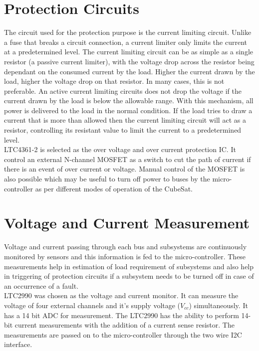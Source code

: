 \section[Protection Circuits]{Protection Circuits}
The circuit used for the protection purpose is the current limiting circuit. Unlike a
fuse that breaks a circuit connection, a current limiter only limits the current at a
predetermined level. The current limiting circuit can be as simple as a single
resistor (a passive current limiter), with the voltage drop across the resistor being
dependant on the consumed current by the load. Higher the current drawn by the
load, higher the voltage drop on that resistor. In many cases, this is not preferable.
An active current limiting circuits does not drop the voltage if the current drawn by
the load is below the allowable range. With this mechanism, all power is delivered
to the load in the normal condition. If the load tries to draw a current that is more
than allowed then the current limiting circuit will act as a resistor, controlling its
resistant value to limit the current to a predetermined level.
\\
LTC4361-2 is selected as the over voltage and over current protection IC. It control an external N-channel MOSFET as a switch to cut the path of current if there is an event of over current or voltage. Manual control of the MOSFET is also possible which may be useful to turn off power to buses by the micro-controller as per different modes of operation of the CubeSat.

\section{Voltage and Current Measurement}
 Voltage and current passing through each bus and subsystems are continuously monitored by sensors and this information is fed to the micro-controller. These measurements help in estimation of load requirement of subsystems and also help in triggering of protection circuits if a subsystem needs to be turned off in case of an occurrence of a fault. 
 \\
 LTC2990 was chosen as the voltage  and current monitor. It can measure the voltage of four external channels and it's supply voltage ($V_{cc}$) simultaneously. It has a 14 bit ADC for measurement. The LTC2990 has the ability to perform 14-bit current measurements with the addition of a current sense resistor. The measurements are passed on to the micro-controller through the two wire I2C interface.